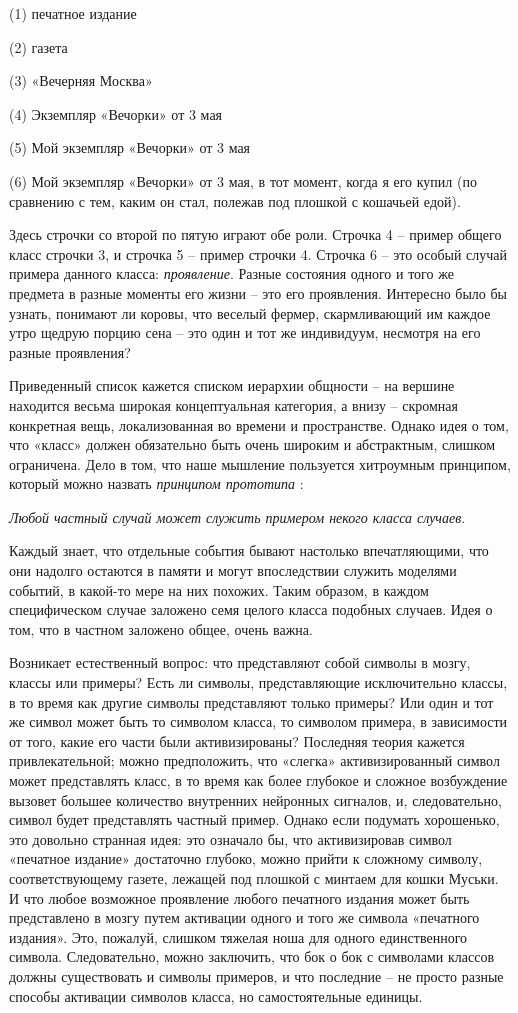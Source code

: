 \documentclass[../main.tex]{subfiles}
\begin{document}
(1) печатное издание

(2) газета

(3) «Вечерняя Москва»

(4) Экземпляр «Вечорки» от 3 мая

(5) Мой экземпляр «Вечорки» от 3 мая

(6) Мой экземпляр «Вечорки» от 3 мая, в тот момент, когда я его купил (по сравнению с тем, каким он стал, полежав под плошкой с кошачьей едой).

Здесь строчки со второй по пятую играют обе роли. Строчка 4 \--- пример общего класс строчки 3, и строчка 5 \--- пример строчки 4. Строчка 6 \--- это особый случай примера данного класса: \emph{проявление}. Разные состояния одного и того же предмета в разные моменты его жизни \--- это его проявления. Интересно было бы узнать, понимают ли коровы, что веселый фермер, скармливающий им каждое утро щедрую порцию сена \--- это один и тот же индивидуум, несмотря на его разные проявления?

Приведенный список кажется списком иерархии общности \--- на вершине находится весьма широкая концептуальная категория, а внизу \--- скромная конкретная вещь, локализованная во времени и пространстве. Однако идея о том, что «класс» должен обязательно быть очень широким и абстрактным, слишком ограничена. Дело в том, что наше мышление пользуется хитроумным принципом, который можно назвать \emph{принципом прототипа} :

\emph{Любой частный случай может служить примером некого класса случаев}.

Каждый знает, что отдельные события бывают настолько впечатляющими, что они надолго остаются в памяти и могут впоследствии служить моделями событий, в какой-то мере на них похожих. Таким образом, в каждом специфическом случае заложено семя целого класса подобных случаев. Идея о том, что в частном заложено общее, очень важна.

Возникает естественный вопрос: что представляют собой символы в мозгу, классы или примеры? Есть ли символы, представляющие исключительно классы, в то время как другие символы представляют только примеры? Или один и тот же символ может быть то символом класса, то символом примера, в зависимости от того, какие его части были активизированы? Последняя теория кажется привлекательной; можно предположить, что «слегка» активизированный символ может представлять класс, в то время как более глубокое и сложное возбуждение вызовет большее количество внутренних нейронных сигналов, и, следовательно, символ будет представлять частный пример. Однако если подумать хорошенько, это довольно странная идея: это означало бы, что активизировав символ «печатное издание» достаточно глубоко, можно прийти к сложному символу, соответствующему газете, лежащей под плошкой с минтаем для кошки Муськи. И что любое возможное проявление любого печатного издания может быть представлено в мозгу путем активации одного и того же символа «печатного издания». Это, пожалуй, слишком тяжелая ноша для одного единственного символа. Следовательно, можно заключить, что бок о бок с символами классов должны существовать и символы примеров, и что последние \--- не просто разные способы активации символов класса, но самостоятельные единицы.
\end{document}
